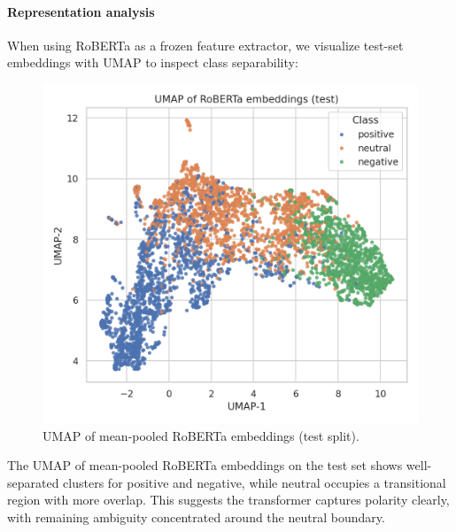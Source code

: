 \documentclass[10pt]{article}
\begin{document}
\paragraph{Representation analysis}
When using RoBERTa as a frozen feature extractor, we visualize test-set embeddings with UMAP to inspect class separability:
\begin{figure}[H]
  \centering
  \includegraphics[width=.75\linewidth]{../SCRITPS/artifacts/figures/roberta_fe_test_umap.png}
  \caption{UMAP of mean-pooled RoBERTa embeddings (test split).}
  \label{fig:umap-roberta}
\end{figure}
The UMAP of mean-pooled RoBERTa embeddings on the test set shows well-separated clusters for positive and negative, while neutral occupies a transitional region with more overlap. This suggests the transformer captures polarity clearly, with remaining ambiguity concentrated around the neutral boundary.
\end{document}
